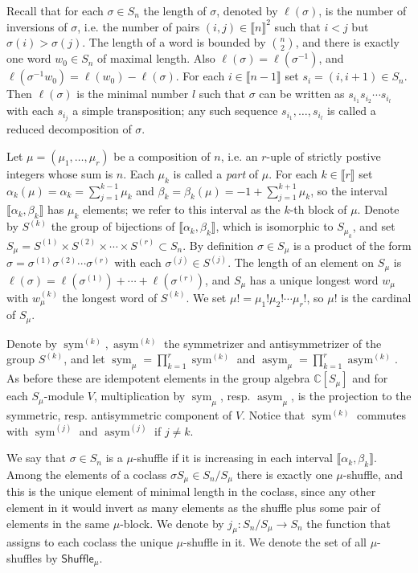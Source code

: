 \documentclass[11pt,fleqn]{article}
\newcommand\CC{\mathbb C}
\renewcommand\to{\longrightarrow}
\newcommand\interval[1]{\llbracket #1 \rrbracket}
\newcommand\Shuffle{\mathsf{Shuffle}}
\DeclareMathOperator\sym{sym}
\DeclareMathOperator\asym{asym}
\begin{document}
Recall that for each $\sigma \in S_n$ the length of $\sigma$, denoted by 
$\ell(\sigma)$, is the number of inversions of $\sigma$, i.e. the number
of pairs $(i,j) \in \interval{n}^2$ such that $i<j$ but $\sigma(i) > 
\sigma(j)$. The length of a word is bounded by $\binom{n}{2}$, and there is 
exactly one word $w_0 \in S_n$ of maximal length. Also $\ell(\sigma) = 
\ell(\sigma^{-1})$, and $\ell(\sigma^{-1} w_0) = \ell(w_0) - \ell(\sigma)$. 
For each $i \in \interval{n-1}$ set $s_i = (i,i+1) \in S_n$. Then 
$\ell(\sigma)$ is the minimal number $l$ such that $\sigma$ can be 
written as $s_{i_1} s_{i_2} \cdots s_{i_l}$ with each $s_{i_j}$ a simple 
transposition; any such sequence $s_{i_1}, \ldots, s_{i_l}$ is called a 
reduced decomposition of $\sigma$. 

Let $\mu = (\mu_1, \ldots, \mu_r)$ be a composition of $n$, i.e. an $r$-uple 
of strictly postive integers whose sum is $n$. Each $\mu_k$ is called a 
\emph{part} of $\mu$. For each $k \in \interval{r}$ set $\alpha_k(\mu) = 
\alpha_k = \sum_{j=1}^{k-1} \mu_k$ and $\beta_k = \beta_k(\mu) = 
-1+\sum_{j=1}^{k+1} \mu_k$, so the interval $\interval{\alpha_k, \beta_k}$ has 
$\mu_k$ elements; we refer to this interval as the $k$-th block of $\mu$. 
Denote by $S^{(k)}$ the group of bijections of $\interval{\alpha_k, \beta_k}$, 
which is isomorphic to $S_{\mu_k}$, and set $S_\mu = S^{(1)} \times S^{(2)} 
\times \cdots \times S^{(r)} \subset S_n$. By definition $\sigma \in S_\mu$ 
is a product of the form $\sigma = \sigma^{(1)} \sigma^{(2)} \cdots 
\sigma^{(r)}$ with each $\sigma^{(j)} \in S^{(j)}$. The length 
of an element on $S_\mu$ is $\ell(\sigma) = \ell(\sigma^{(1)}) + \cdots + 
\ell(\sigma^{(r)})$, and $S_\mu$ has a unique longest word $w_\mu$ with 
$w_\mu^{(k)}$ the longest word of $S^{(k)}$. We set $\mu! = \mu_1! \mu_2! 
\cdots \mu_r!$, so $\mu!$ is the cardinal of $S_\mu$.

Denote by $\sym^{(k)}, \asym^{(k)}$ the symmetrizer and antisymmetrizer of the
group $S^{(k)}$, and let $\sym_\mu = \prod_{k=1}^r \sym^{(k)}$ and $\asym_\mu
= \prod_{k=1}^r \asym^{(k)}$. As before these are idempotent elements in the
group algebra $\CC[S_\mu]$ and for each $S_\mu$-module $V$, multiplication by
$\sym_\mu$, resp. $\asym_\mu$, is the projection to the symmetric, resp. 
antisymmetric component of $V$. Notice that $\sym^{(k)}$ commutes with 
$\sym^{(j)}$ and $\asym^{(j)}$ if $j \neq k$.

We say that $\sigma \in S_n$ is a $\mu$-shuffle if it is increasing in each 
interval $\interval{\alpha_k, \beta_k}$. Among the elements of a coclass 
$\sigma S_\mu \in S_n/S_\mu$ there is exactly one $\mu$-shuffle, and this is 
the unique element of minimal length in the coclass, since any other element
in it would invert as many elements as the shuffle plus some pair of 
elements in the same $\mu$-block. We denote by $j_\mu: S_n/S_\mu \to S_n$
the function that assigns to each coclass the unique $\mu$-shuffle in it. 
We denote the set of all $\mu$-shuffles by $\Shuffle_\mu$.
\end{document}
